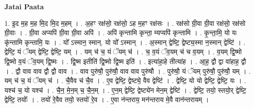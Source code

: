 \documentclass[17pt]{extarticle}
\begin{document}
\textbf{Jatai Paata} \newline

1. इ॒द म॒ह म॒ह मि॒द मि॒द म॒हम् । . अ॒हꣳ रक्ष॑सो॒ रक्ष॑सो॒ ऽह म॒हꣳ रक्ष॑सः । . रक्ष॑सो ग्री॒वा ग्री॒वा रक्ष॑सो॒ रक्ष॑सो ग्री॒वाः । . ग्री॒वा अप्यपि॑ ग्री॒वा ग्री॒वा अपि॑ । . अपि॑ कृन्तामि कृन्ता॒ म्यप्यपि॑ कृन्तामि । . कृ॒न्ता॒मि॒ यो यः कृ॑न्तामि कृन्तामि॒ यः । . यो᳚ ऽस्मान॒ स्मान्. यो यो᳚ ऽस्मान् । . अ॒स्मान् द्वेष्टि॒ द्वेष्ट्य॒स्मा न॒स्मान् द्वेष्टि॑ । . द्वेष्टि॒ यं ॅयम् द्वेष्टि॒ द्वेष्टि॒ यम् । . यम् च॑ च॒ यं ॅयम् च॑ । . च॒ व॒यं ॅव॒यम् च॑ च व॒यम् । . व॒यम् द्वि॒ष्मो द्वि॒ष्मो व॒यं ॅव॒यम् द्वि॒ष्मः । . द्वि॒ष्म इतीति॑ द्वि॒ष्मो द्वि॒ष्म इति॑ । . इत्या॑हा॒हे तीत्या॑ह । . आ॒ह॒ द्वौ द्वा वा॑हाह॒ द्वौ । . द्वौ वाव वाव द्वौ द्वौ वाव । . वाव पुरु॑षौ॒ पुरु॑षौ॒ वाव वाव पुरु॑षौ । . पुरु॑षौ॒ यं ॅयम् पुरु॑षौ॒ पुरु॑षौ॒ यम् । . यम् च॑ च॒ यं ॅयम् च॑ । . चै॒वैव च॑ चै॒व । . ए॒व द्वेष्टि॒ द्वेष्ट्ये॒ वैव द्वेष्टि॑ । . द्वेष्टि॒ यो यो द्वेष्टि॒ द्वेष्टि॒ यः । . यश्च॑ च॒ यो यश्च॑ । . चै॒न॒ मे॒न॒म् च॒ चै॒न॒म् । . ए॒न॒म् द्वेष्टि॒ द्वेष्ट्ये॑न मेन॒म् द्वेष्टि॑ । . द्वेष्टि॒ तयो॒ स्तयो॒र् द्वेष्टि॒ द्वेष्टि॒ तयोः᳚ । . तयो॑ रे॒वैव तयो॒ स्तयो॑ रे॒व । . ए॒वा न॑न्तराय॒ मन॑न्तराय मे॒वै वान॑न्तरायम् । \newline
\end{document}
